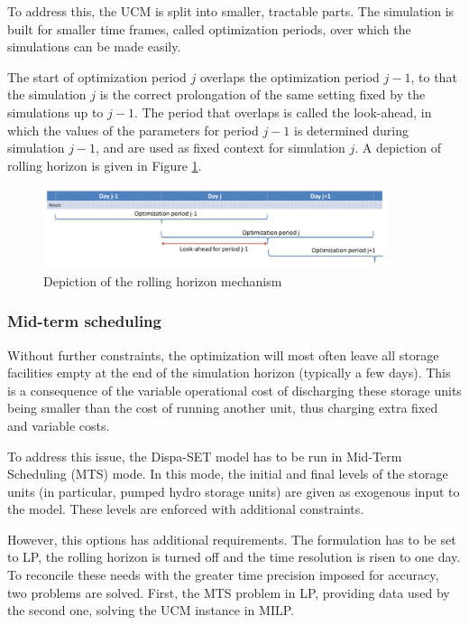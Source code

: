 To address this, the UCM is split into smaller, tractable parts. The simulation is built for smaller time frames, called optimization periods, over which the simulations can be made easily.

The start of optimization period $j$ overlaps the optimization period $j-1$, to that the simulation $j$ is the correct prolongation of the same setting fixed by the simulations up to $j-1$. The period that overlaps is called the look-ahead, in which the values of the parameters for period $j-1$ is determined during simulation $j-1$, and are used as fixed context for simulation $j$. A depiction of rolling horizon is given in Figure \ref{fig:rolling-horizon}.

\begin{figure}[h]
    \centering
    \includegraphics[width=0.9\textwidth]{resources/images/rolling_horizon.png}
    \caption{Depiction of the rolling horizon mechanism}
    \label{fig:rolling-horizon}
\end{figure}

\subsubsection{Mid-term scheduling}

Without further constraints, the optimization will most often leave all storage facilities empty at the end of the simulation horizon (typically a few days). This is a consequence of the variable operational cost of discharging these storage units being smaller than the cost of running another unit, thus charging extra fixed and variable costs.

To address this issue, the Dispa-SET model has to be run in Mid-Term Scheduling (MTS) mode. In this mode, the initial and final levels of the storage units (in particular, pumped hydro storage units) are given as exogenous input to the model. These levels are enforced with additional constraints.

However, this options has additional requirements. The formulation has to be set to LP, the rolling horizon is turned off and the time resolution is risen to one day. To reconcile these needs with the greater time precision imposed for accuracy, two problems are solved. First, the MTS problem in LP, providing data used by the second one, solving the UCM instance in MILP.

